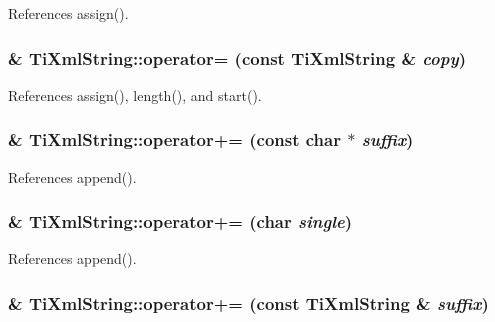 References assign().
\subsubsection[operator=]{\& TiXmlString::operator= (const {\bf TiXmlString} \& {\em copy})\hspace{0.3cm}{\tt  [inline]}}\label{classTiXmlString_b1f1f5d3eceaa0f22d0a7e6055ea81b0}




References assign(), length(), and start().
\subsubsection[operator+=]{\& TiXmlString::operator+= (const char $\ast$ {\em suffix})\hspace{0.3cm}{\tt  [inline]}}\label{classTiXmlString_b56336ac2aa2a08d24a71eb9a2b502a5}




References append().
\subsubsection[operator+=]{\& TiXmlString::operator+= (char {\em single})\hspace{0.3cm}{\tt  [inline]}}\label{classTiXmlString_6aa09d5240470b76d54ec709e04f8c13}




References append().
\subsubsection[operator+=]{\& TiXmlString::operator+= (const {\bf TiXmlString} \& {\em suffix})\hspace{0.3cm}{\tt  [inline]}}\label{classTiXmlString_fdcae5ea2b4d9e194dc21226b817f417}




